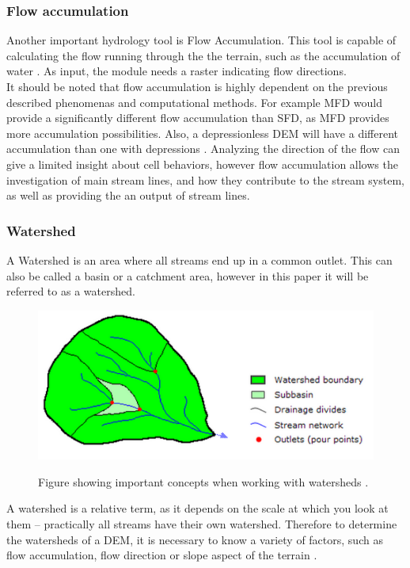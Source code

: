 \subsubsection{Flow accumulation}
Another important hydrology tool is Flow Accumulation. This tool is capable of calculating the flow running through the the terrain, such as the accumulation of water \citep{sfdmfd}. As input, the module needs a raster indicating flow directions. \\ 
It should be noted that flow accumulation is highly dependent on the previous described phenomenas and computational methods. For example MFD would provide a significantly different flow accumulation than SFD, as MFD provides more accumulation possibilities. Also, a depressionless DEM will have a different accumulation than one with depressions \citep{sfdmfd}. Analyzing the direction of the flow can give a limited insight about cell behaviors, however flow accumulation allows the investigation of main stream lines, and how they contribute to the stream system, as well as providing the an output of stream lines.

\subsubsection{Watershed}
A Watershed is an area where all streams end up in a common outlet. This can also be called a basin or a catchment area, however in this paper it will be referred to as a watershed.\\


\begin{figure}[h]
\centering
	{\includegraphics[width=\linewidth]{gfx/Watershed.png}}
\caption{Figure showing important concepts when working with watersheds \citep{watershed}.}
\end{figure}

A watershed is a relative term, as it depends on the scale at which you look at them – practically all streams have their own watershed. Therefore to determine the watersheds of a DEM, it is necessary to know a variety of factors, such as flow accumulation, flow direction or slope aspect of the terrain \citep{rwatershed}.\\

